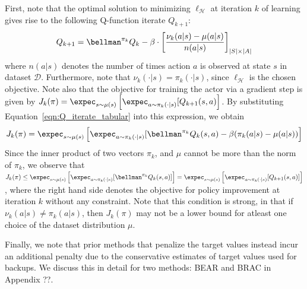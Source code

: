 First, note that the optimal solution to minimizing $\ell_\mathcal{H}$ at iteration $k$ of learning gives rise to the following Q-function iterate $Q_{k+1}$:
\begin{equation}
    \label{eqn:Q_iterate_tabular}
    Q_{k+1} = \bellman^{\pi_k} Q_{k} - \beta \cdot \left[\frac{\nu_k(a|s) - \mu(a|s)}{n(a|s)} \right]_{|S| \times |A|}
\end{equation}
where $n(a|s)$ denotes the number of times action $a$ is observed at state $s$ in dataset $\mathcal{D}$. Furthermore, note that $\nu_k(\cdot|s) = \pi_k(\cdot|s)$, since $\ell_{\mathcal{H}}$ is the chosen objective. Note also that the objective for training the actor via a gradient step
is given by $J_k(\pi) = \expec_{s \sim \mu(s)} \left[ \expec_{a \sim \pi_k(\cdot|s)}[Q_{k+1}(s, a) \right]$. By substituting Equation~\ref{eqn:Q_iterate_tabular} into this expression, we obtain
\begin{equation}
    J_k(\pi) = \expec_{s \sim \mu(s)} \left[ \expec_{a \sim \pi_k(\cdot|s)}[\bellman^{\pi_k} Q_k(s, a) - \beta (\pi_k(a|s) - \mu(a|s)) \right]
\end{equation}
Since the inner product of two vectors $\pi_k$, and $\mu$ cannot be more than the norm of $\pi_k$, we observe that $J_k(\pi) \leq \expec_{s \sim \mu(s)} \left[ \expec_{a \sim \pi_k(\cdot|s)}[\bellman^{\pi_k} Q_k(s, a)] \right] = \expec_{s \sim \mu(s)} \left[ \expec_{a \sim \pi_k(\cdot|s)}[Q_{k+1}(s, a)] \right]$, where the right hand side denotes the objective for policy improvement at iteration $k$ without any constraint. Note that this condition is strong, in that if $\nu_k(a|s) \neq \pi_k(a|s)$, then $J_k(\pi)$ may not be a lower bound for atleast one choice of the dataset distribution $\mu$.

Finally, we note that prior methods that penalize the target values instead incur an additional penalty due to the conservative estimates of target values used for backups. We discuss this in detail for two methods: BEAR and BRAC in Appendix ??.

